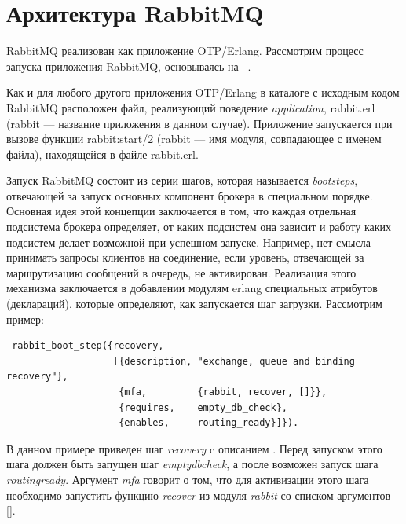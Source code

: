 \section{Архитектура RabbitMQ}
RabbitMQ реализован как приложение OTP/Erlang. Рассмотрим процесс запуска приложения RabbitMQ, основываясь на ~\cite{rabbit_boot_step}.

Как и для любого другого приложения OTP/Erlang в каталоге с исходным кодом RabbitMQ расположен файл, реализующий поведение \textit{application}, rabbit.erl (rabbit --- название приложения в данном случае). Приложение запускается при вызове функции rabbit:start/2 (rabbit --- имя модуля, совпадающее с именем файла), находящейся в файле rabbit.erl.

Запуск RabbitMQ состоит из серии шагов, которая называется \textit{boot\thinspace steps}, отвечающей за запуск основных компонент брокера в специальном порядке. Основная идея этой концепции заключается в том, что каждая отдельная подсистема брокера определяет, от каких подсистем она зависит и работу каких подсистем делает возможной при успешном запуске. Например, нет смысла принимать запросы клиентов на соединение, если уровень, отвечающей за маршрутизацию сообщений в очередь, не активирован. Реализация этого механизма заключается в добавлении модулям erlang специальных атрибутов (деклараций),  которые определяют, как запускается шаг загрузки. Рассмотрим пример:
\begin{lstlisting}
-rabbit_boot_step({recovery,
                   [{description, "exchange, queue and binding recovery"},
                    {mfa,         {rabbit, recover, []}},
                    {requires,    empty_db_check},
                    {enables,     routing_ready}]}).
\end{lstlisting}
В данном примере приведен шаг \textit{recovery} c описанием . 
Перед запуском этого шага должен быть запущен шаг \textit{empty\underline{\hspace{0.25cm}}db\underline{\hspace{0.25cm}}check}, а после возможен запуск шага \textit{routing\underline{\hspace{0.25cm}}ready}. Аргумент \textit{mfa} говорит о том, что для активизации этого шага необходимо запустить функцию \textit{recover} из модуля \textit{rabbit} со списком аргументов [].

